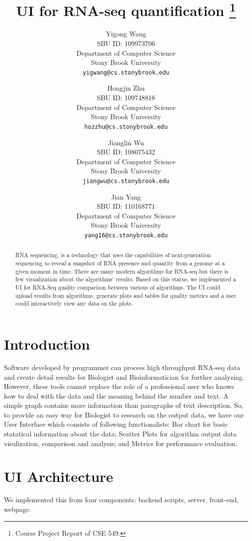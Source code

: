 \documentclass[11pt,letter]{article}
\title{UI for RNA-seq quantification \footnote{Course Project Report of CSE 549.}}
\author{
Yigong Wang\\
       {\small SBU ID: 109973706}\\
       {\small Department of Computer Science}\\
       {\small Stony Brook University} \\
       {\small \texttt{yigwang@cs.stonybrook.edu}}
\and
Hongjin Zhu \\
       {\small SBU ID: 109748818}\\
       {\small Department of Computer Science}\\
       {\small Stony Brook University} \\
       {\small \texttt{hozzhu@cs.stonybrook.edu}}
\and
Jianglin Wu \\
       {\small SBU ID: 108075432}\\
       {\small Department of Computer Science}\\
       {\small Stony Brook University} \\
       {\small \texttt{jiangwu@cs.stonybrook.edu}}
\and
Jian Yang \\
       {\small SBU ID: 110168771}\\
       {\small Department of Computer Science}\\
       {\small Stony Brook University}\\
       {\small \texttt{yang16@cs.stonybrook.edu}}
}
\date{}
\begin{document}
\maketitle

\begin{abstract}
RNA sequencing, is a technology that uses the capabilities of next-generation sequencing to reveal a snapshot of RNA presence and quantity from a genome at a given moment in time. There are many modern algorithms for RNA-seq but there is few visualization about the algorithms' results. Based on this status, we implemented a UI for RNA-Seq quality comparison between various of algorithms. The UI could upload results from algorithms, generate plots and tables for quality metrics and a user could interactively view any data on the plots.
\end{abstract}

\thispagestyle{empty}
\addtocounter{page}{0}

\section {Introduction}

Software developed by programmer can process high throughput RNA-seq data and create detail results for Biologist and Bioinformatician for further analyzing. However, these tools cannot replace the role of a professional user who knows how to deal with the data and the meaning behind the number and text.  A simple graph contains more information than paragraphs of text description.  So, to provide an easy way for Biologist to research on the output data, we have our User Interface which consists of following functionalists: Bar chart for basic statatical information about the data; Scatter Plots for algorithm output data visulization, comparison and analysis; and Metrics for performance evaluation.   \\


\section {UI Architecture}
We implemented this from four components: backend scripts, server, front-end, webpage. \\
\end{document}
